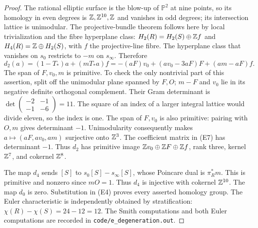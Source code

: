 \begin{proof}
The rational elliptic surface is the blow-up of $\mathbb P^2$ at nine
points, so its homology in even degrees is $\mathbb Z,\mathbb Z^{10},\mathbb Z$ and
vanishes in odd degrees; its intersection lattice is unimodular.
The projective-bundle theorem follows here by local trivialization
and the fibre hyperplane class: $H_2(R)=H_2(S)\oplus\mathbb Z f$ and
$H_4(R)=\mathbb Z\oplus H_2(S)$, with $f$ the projective-line fibre.
The hyperplane class that vanishes on $s_0$ restricts to $-m$ on
$s_\infty$. Therefore
\[
 d_2(a)=(1-T_*)a+(mT_*a)f
       =-(aF)v_0+(av_0-3aF)F+(am-aF)f.                       \tag{E7}
\]
The span of $F,v_0,m$ is primitive. To check the only nontrivial
part of this assertion, split off the unimodular plane spanned by
$F,O$; $m-F$ and $v_0$ lie in its negative definite orthogonal
complement. Their Gram determinant is
$\det\left(\begin{smallmatrix}-2&-1\\-1&-6\end{smallmatrix}\right)=11$.
The square of an index of a larger integral lattice would divide
eleven, so the index is one. The span of $F,v_0$ is also primitive:
pairing with $O,m$ gives determinant $-1$. Unimodularity consequently
makes $a\mapsto(aF,av_0,am)$ surjective onto $\mathbb Z^3$. The coefficient
matrix in (E7) has determinant $-1$. Thus $d_2$ has primitive image
$\mathbb Z v_0\oplus\mathbb Z F\oplus\mathbb Z f$, rank three, kernel $\mathbb Z^7$,
and cokernel $\mathbb Z^8$.

The map $d_4$ sends $[S]$ to $s_0[S]-s_\infty[S]$, whose Poincare
dual is $\pi_R^*m$. This is primitive and nonzero since $mO=1$.
Thus $d_4$ is injective with cokernel $\mathbb Z^{10}$. The map $d_0$ is
zero. Substitution in (E4) proves every asserted homology group.
The Euler characteristic is independently obtained by stratification:
$\chi(R)-\chi(S)=24-12=12$. The Smith computations and both Euler
computations are recorded in \texttt{code/e\_degeneration.out}.
\end{proof}

